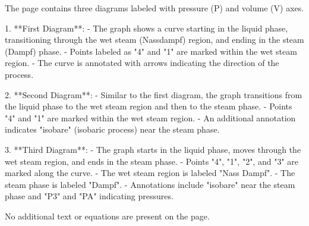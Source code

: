 The page contains three diagrams labeled with pressure (P) and volume (V) axes.  

1. **First Diagram**:  
   - The graph shows a curve starting in the liquid phase, transitioning through the wet steam (Nassdampf) region, and ending in the steam (Dampf) phase.  
   - Points labeled as "4" and "1" are marked within the wet steam region.  
   - The curve is annotated with arrows indicating the direction of the process.  

2. **Second Diagram**:  
   - Similar to the first diagram, the graph transitions from the liquid phase to the wet steam region and then to the steam phase.  
   - Points "4" and "1" are marked within the wet steam region.  
   - An additional annotation indicates "isobare" (isobaric process) near the steam phase.  

3. **Third Diagram**:  
   - The graph starts in the liquid phase, moves through the wet steam region, and ends in the steam phase.  
   - Points "4", "1", "2", and "3" are marked along the curve.  
   - The wet steam region is labeled "Nass Dampf".  
   - The steam phase is labeled "Dampf".  
   - Annotations include "isobare" near the steam phase and "P3" and "PA" indicating pressures.  

No additional text or equations are present on the page.